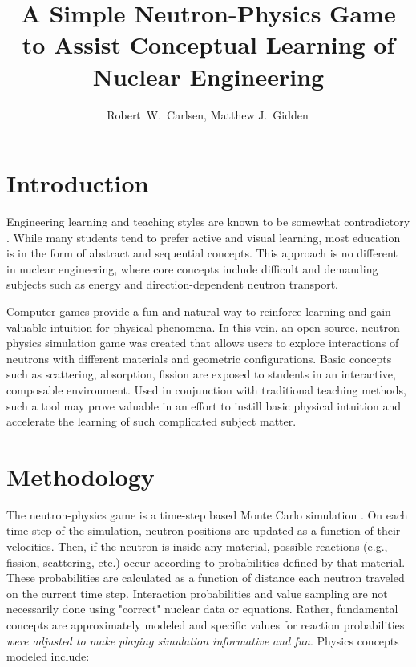 \documentclass{anstrans}
\title{A Simple Neutron-Physics Game to Assist Conceptual Learning of Nuclear
  Engineering}
\author{Robert~W.~Carlsen, Matthew J.~Gidden$^{\*}$}
\institute{
University of Wisconsin, Nuclear Engineering Dept., 1500 Engineering Dr., Madison, WI
}
\begin{document}
\section{Introduction}

Engineering learning and teaching styles are known to be somewhat
contradictory \cite{felder2000learning}. While many students tend to prefer
active and visual learning, most education is in the form of abstract and
sequential concepts. This approach is no different in nuclear engineering,
where core concepts include difficult and demanding subjects such as energy
and direction-dependent neutron transport. 

Computer games provide a fun and natural way to reinforce learning and gain
valuable intuition for physical phenomena. In this vein, an open-source,
neutron-physics simulation game was created \cite{Carlsen2015} that allows users
to explore interactions of neutrons with different materials and geometric
configurations. Basic concepts such as scattering, absorption, fission are
exposed to students in an interactive, composable environment. Used in
conjunction with traditional teaching methods, such a tool may prove valuable in
an effort to instill basic physical intuition and accelerate the learning of
such complicated subject matter.

\section{Methodology}

The neutron-physics game is a time-step based Monte Carlo simulation
\cite{lewis1984computational}. On each time step of the simulation, neutron
positions are updated as a function of their velocities.  Then, if the neutron
is inside any material, possible reactions (e.g., fission, scattering, etc.)
occur according to probabilities defined by that material.  These probabilities
are calculated as a function of distance each neutron traveled on the current
time step.  Interaction probabilities and value sampling are not necessarily
done using "correct" nuclear data or equations.  Rather, fundamental concepts
are approximately modeled and specific values for reaction probabilities
\textit{were adjusted to make playing simulation informative and fun}.  Physics
concepts modeled include:
\end{document}
